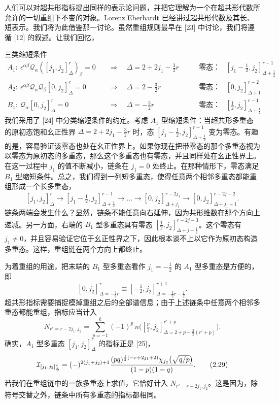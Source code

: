人们可以对超共形指标提出同样的表示论问题，并把它理解为一个在超共形代数所允许的一切重组下不变的对象。Lorenz Eberhardt 已经讲过超共形代数及其长、短表示。我们将为此借鉴那一讨论。虽然重组规则最早在 [23] 中讨论，我们将遵循 [12] 的叙述。让我们回忆，

三类缩短条件
\[
\begin{aligned}
A_1:\ \epsilon^{\alpha\beta}\mathcal{Q}_\alpha([j_1,j_2]^r_\Delta)_\beta=0
&\quad\Rightarrow\quad \Delta=2+2j_1-\frac32 r
&\qquad\text{零态：}\quad &[j_1-\tfrac12,j_2]^{r-1}_{\Delta+\frac12}\\
A_2:\ \epsilon^{\alpha\beta}\mathcal{Q}_\alpha\mathcal{Q}_\beta[0,j_2]^r_\Delta=0
&\quad\Rightarrow\quad \Delta=2-\frac32 r
&\qquad\text{零态：}\quad &[0,j_2]^{r-2}_{\Delta+1}\\
B_1:\ \mathcal{Q}_\alpha[0,j_2]^r_\Delta=0
&\quad\Rightarrow\quad \Delta=-\frac32 r
&\qquad\text{零态：}\quad &[\tfrac12,j_2]^{r-1}_{\Delta+\frac12}
\end{aligned}
\tag{2.25}
\]
我们采用了 [24] 中分类缩短条件的约定。考虑 $A_1$ 型缩短条件：当超共形多重态的原初态饱和幺正性界 $\Delta=2+2j_1-\frac32 r$ 时，态 $[j_1-\frac12,j_2]^{r-1}_{\Delta+\frac12}$ 变为零态。有趣的是，容易验证该零态也处在幺正性界上。如果你现在把带零态的那个多重态视为以零态为原初态的多重态，那么这个多重态也有零态，并且同样处在幺正性界上。在这一过程中 $j_1$ 的值不断减小，链条在 $j_1=0$ 处终止。在那种情形下，零态满足 $B_1$ 型缩短条件。总之，我们得到一列短多重态，使得任意两个相邻多重态都能重组形成一个长多重态，
\[
[j_1,j_2]^r_\Delta\to[j_1-\tfrac12,j_2]^{r-1}_{\Delta+\frac12}\to\ldots\to[0,j_2]^{r-2j_1}_{\Delta+j_1}\to[0,j_2]^{r-2j-2}_{\Delta+j_1+1} .
\tag{2.26}
\]
链条两端会发生什么？显然，链条不能任意向右延伸，因为共形维数在那个方向上递减。另一方面，右端的 $B_1$ 型多重态具有零态 $[\frac12,j_2]^{r-2j-3}_{\Delta+j+\frac12}$。这个零态有 $j_1\neq0$，并且容易验证它位于幺正性界之下，因此根本谈不上以它作为原初态构造多重态。这样，重组链在两个方向上都终止。

为着重组的用途，把末端的 $B_1$ 型多重态看作 $j_1=-\frac12$ 的 $A_1$ 型多重态是方便的，即
\[
[0,j_2]^{r}_{\Delta=-\frac32 r}\equiv[-\tfrac12,j_2]^{r+1}_{\Delta=-\frac32 r-\frac12} .
\tag{2.27}
\]
超共形指标需要捕捉模掉重组之后的全部谱信息；由于上述链条中任意两个相邻多重态都能重组，指标应当计入
\[
N_{r'=r-2j_1,j_2}=\sum_{p=-1}^{k}(-1)^p\,n\big([\tfrac{p}{2},j_2]^{r'+p}_{\Delta=2+p-\frac32(r'+p)}\big) .
\tag{2.28}
\]
确实，$A_1$ 型多重态 $[j_1,j_2]^r_\Delta$ 的指标正是 [25]，
\[
\mathcal{I}_{[j_1,j_2]^r_\Delta}=(-)^{2(j_1+j_2)+1}\frac{(pq)^{\frac12(-r+2j_1+2)}\chi_{j_2}\big(\sqrt{q/p}\big)}{(1-p)(1-q)} .
\tag{2.29}
\]
若我们在重组链中的一族多重态上求值，它恰好计入 $N_{r'=r-2j_1,j_2}$。这是因为，除符号交替之外，链条中所有多重态的指标都相同。

